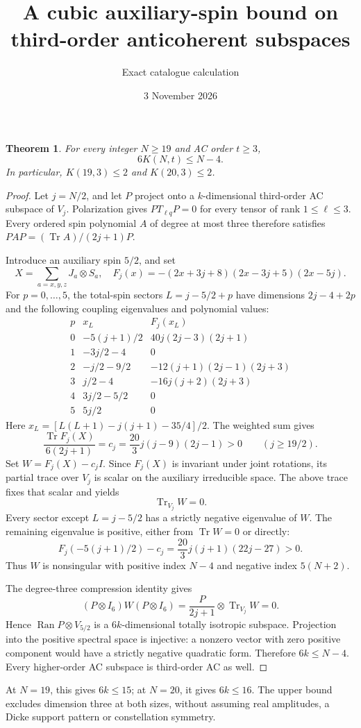 \documentclass[11pt]{article}
\newtheorem{theorem}{Theorem}
\newcommand{\Tr}{\operatorname{Tr}}
\begin{document}
\title{A cubic auxiliary-spin bound on third-order anticoherent subspaces}
\author{Exact catalogue calculation}
\date{3 November 2026}
\maketitle
\begin{theorem}
For every integer $N\ge19$ and AC order $t\ge3$,
\[
\boxed{6K(N,t)\le N-4.}
\]
In particular, $K(19,3)\le2$ and $K(20,3)\le2$.
\end{theorem}
\begin{proof}
Let $j=N/2$, and let $P$ project onto a $k$-dimensional third-order AC
subspace of $V_j$. Polarization gives $PT_{\ell q}P=0$ for every tensor
of rank $1\le\ell\le3$. Every ordered spin polynomial $A$ of degree at
most three therefore satisfies $PAP=(\Tr A)/(2j+1)P$.

Introduce an auxiliary spin $5/2$, and set
\[
X=\sum_{a=x,y,z}J_a\otimes S_a,
\quad F_j(x)=-(2x+3j+8)(2x-3j+5)(2x-5j).
\]
For $p=0,\ldots,5$, the total-spin sectors $L=j-5/2+p$ have dimensions
$2j-4+2p$ and the following coupling eigenvalues and polynomial values:
\[
\begin{array}{c|c|c}
p&x_L&F_j(x_L)\\\hline
0&-5(j+1)/2&40j(2j-3)(2j+1)\\
1&-3j/2-4&0\\
2&-j/2-9/2&-12(j+1)(2j-1)(2j+3)\\
3&j/2-4&-16j(j+2)(2j+3)\\
4&3j/2-5/2&0\\
5&5j/2&0
\end{array}
\]
Here $x_L=[L(L+1)-j(j+1)-35/4]/2$. The weighted sum gives
\[
\frac{\Tr F_j(X)}{6(2j+1)}
=c_j=\frac{20}{3}j(j-9)(2j-1)>0\qquad(j\ge19/2).
\]
Set $W=F_j(X)-c_jI$. Since $F_j(X)$ is invariant under joint rotations,
its partial trace over $V_j$ is scalar on the auxiliary irreducible
space. The above trace fixes that scalar and yields
\[
\Tr_{V_j}W=0.
\]
Every sector except $L=j-5/2$ has a strictly negative eigenvalue of $W$.
The remaining eigenvalue is positive, either from $\Tr W=0$ or directly:
\[
F_j(-5(j+1)/2)-c_j
=\frac{20}{3}j(j+1)(22j-27)>0.
\]
Thus $W$ is nonsingular with positive index $N-4$ and negative index
$5(N+2)$.

The degree-three compression identity gives
\[
(P\otimes I_6)W(P\otimes I_6)
=\frac{P}{2j+1}\otimes\Tr_{V_j}W=0.
\]
Hence $\operatorname{Ran}P\otimes V_{5/2}$ is a $6k$-dimensional totally
isotropic subspace. Projection into the positive spectral space is
injective: a nonzero vector with zero positive component would have a
strictly negative quadratic form. Therefore $6k\le N-4$.
Every higher-order AC subspace is third-order AC as well.
\end{proof}
At $N=19$, this gives $6k\le15$; at $N=20$, it gives $6k\le16$.
The upper bound excludes dimension three at both sizes, without assuming
real amplitudes, a Dicke support pattern or constellation symmetry.
\end{document}
